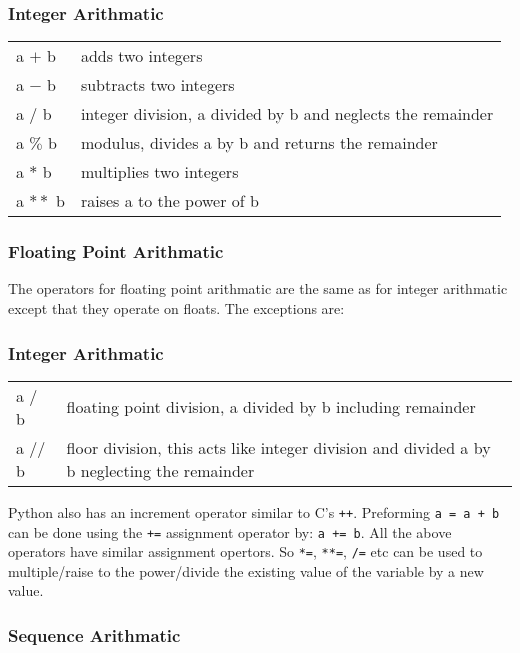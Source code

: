 \documentclass[11pt,a4paper]{article}
\begin{document}
\subsubsection{Integer Arithmatic}
\begin{center}
\begin{tabular}{l l}
a $+$ b & adds two integers \\
a $-$ b & subtracts two integers \\
a  $/$ b & integer division, a divided by b and neglects the remainder \\
a $\%$ b & modulus, divides a by b and returns the remainder \\
a $*$ b & multiplies two integers \\
a $**$ b & raises a to the power of b \\
\end{tabular}
\end{center}

\subsubsection{Floating Point Arithmatic}
The operators for floating point arithmatic are the same as
for integer arithmatic except that they operate on floats. The
exceptions are:

\subsubsection{Integer Arithmatic}
\begin{center}
\begin{tabular}{l l}
a $/$ b & \parbox[t]{10cm}{floating point division, a divided by b including remainder} \\
a $//$ b & \parbox[t]{10cm}{floor division, this acts like integer division and divided a by b neglecting the remainder} \\
\end{tabular}
\end{center}

Python also has an increment operator similar to C's \verb"++". Preforming \verb|a = a + b| can be done using the \verb|+=|  assignment operator by: \verb|a += b|. All the above operators have similar assignment opertors. So \verb|*=|, \verb|**=|, \verb|/=| etc can be used to multiple/raise to the power/divide the existing value of the variable by a new value. 

\subsubsection{Sequence Arithmatic}
\end{document}
